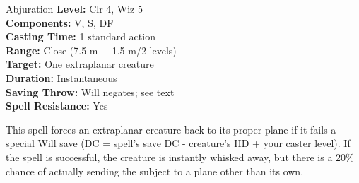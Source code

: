 {Abjuration}
{
	\textbf{Level:}
	Clr 4, Wiz 5\\
	\textbf{Components:}
	V, S, DF\\
	\textbf{Casting Time:}
	1 standard action\\
	\textbf{Range:}
	Close (7.5 m + 1.5 m/2 levels)\\
	\textbf{Target:}
	One extraplanar creature\\
	\textbf{Duration:}
	Instantaneous\\
	\textbf{Saving Throw:}
	Will negates; see text\\
	\textbf{Spell Resistance:}
	Yes\\
}
{
	This spell forces an extraplanar creature back to its proper plane if it fails a special Will save (DC = spell's save DC - creature's HD + your caster level). If the spell is successful, the creature is instantly whisked away, but there is a 20\% chance of actually sending the subject to a plane other than its own.

}

